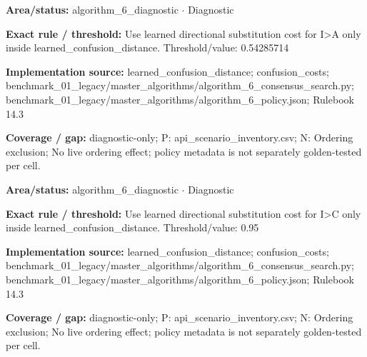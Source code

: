 \begin{tcolorbox}[enhanced,breakable,colback=white,colframe=Muted!45,boxrule=0.45pt,arc=1.5pt,left=6pt,right=6pt,top=5pt,bottom=5pt,title={\texttt{A6-LEARNED-SUBSTITUTION-I-A}},title after break={\texttt{A6-LEARNED-SUBSTITUTION-I-A}\ (continued)},fonttitle=\headingfont\bfseries\color{Navy},coltitle=Navy]
\textbf{Area/status:} algorithm\_\allowbreak{}6\_\allowbreak{}diagnostic $\boldsymbol{\cdot}$ Diagnostic\par
\smallskip
\textbf{Exact rule / threshold:} Use learned directional substitution cost for I>A only inside learned\_\allowbreak{}confusion\_\allowbreak{}distance. Threshold/\allowbreak{}value: 0.54285714\par
\smallskip
\textbf{Implementation source:} learned\_\allowbreak{}confusion\_\allowbreak{}distance; confusion\_\allowbreak{}costs; benchmark\_\allowbreak{}01\_\allowbreak{}legacy/\allowbreak{}master\_\allowbreak{}algorithms/\allowbreak{}algorithm\_\allowbreak{}6\_\allowbreak{}consensus\_\allowbreak{}search.py; benchmark\_\allowbreak{}01\_\allowbreak{}legacy/\allowbreak{}master\_\allowbreak{}algorithms/\allowbreak{}algorithm\_\allowbreak{}6\_\allowbreak{}policy.json; Rulebook 14.3\par
\smallskip
\textbf{Coverage / gap:} diagnostic-only; P: api\_\allowbreak{}scenario\_\allowbreak{}inventory.csv; N: Ordering exclusion; No live ordering effect; policy metadata is not separately golden-tested per cell.
\end{tcolorbox}
\begin{tcolorbox}[enhanced,breakable,colback=white,colframe=Muted!45,boxrule=0.45pt,arc=1.5pt,left=6pt,right=6pt,top=5pt,bottom=5pt,title={\texttt{A6-LEARNED-SUBSTITUTION-I-C}},title after break={\texttt{A6-LEARNED-SUBSTITUTION-I-C}\ (continued)},fonttitle=\headingfont\bfseries\color{Navy},coltitle=Navy]
\textbf{Area/status:} algorithm\_\allowbreak{}6\_\allowbreak{}diagnostic $\boldsymbol{\cdot}$ Diagnostic\par
\smallskip
\textbf{Exact rule / threshold:} Use learned directional substitution cost for I>C only inside learned\_\allowbreak{}confusion\_\allowbreak{}distance. Threshold/\allowbreak{}value: 0.95\par
\smallskip
\textbf{Implementation source:} learned\_\allowbreak{}confusion\_\allowbreak{}distance; confusion\_\allowbreak{}costs; benchmark\_\allowbreak{}01\_\allowbreak{}legacy/\allowbreak{}master\_\allowbreak{}algorithms/\allowbreak{}algorithm\_\allowbreak{}6\_\allowbreak{}consensus\_\allowbreak{}search.py; benchmark\_\allowbreak{}01\_\allowbreak{}legacy/\allowbreak{}master\_\allowbreak{}algorithms/\allowbreak{}algorithm\_\allowbreak{}6\_\allowbreak{}policy.json; Rulebook 14.3\par
\smallskip
\textbf{Coverage / gap:} diagnostic-only; P: api\_\allowbreak{}scenario\_\allowbreak{}inventory.csv; N: Ordering exclusion; No live ordering effect; policy metadata is not separately golden-tested per cell.
\end{tcolorbox}

